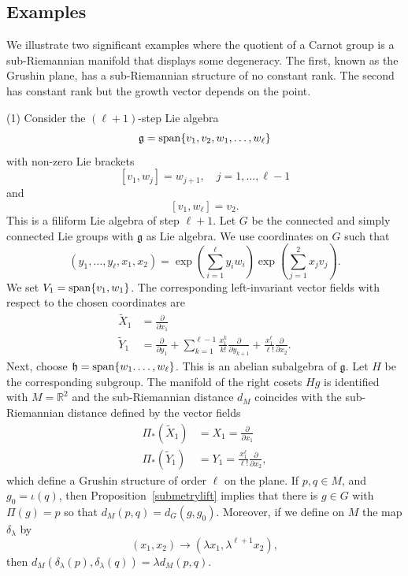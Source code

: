 \documentclass[12pt]{amsart}
\begin{document}
\subsection{Examples}\label{examples}
We illustrate two significant examples where the quotient of a Carnot group is a sub-Riemannian manifold that displays some degeneracy. The first, known as the Grushin plane, has a sub-Riemannian structure of no constant rank. The second has constant rank but the growth vector depends on the point.

(1) Consider the $(\ell +1)$-step Lie algebra 
$$
\mathfrak g = {\rm span}\{v_1,v_2,w_1,\dots,w_\ell\}
$$
with non-zero Lie brackets
$$
[v_1,w_j] = w_{j+1}, \quad j=1,\dots,\ell-1
$$
and
$$
[v_1,w_\ell] = v_2.
$$
This is a filiform Lie algebra of step $\ell +1$.
Let $G$ be the connected and simply connected Lie groups with $\mathfrak g$ as Lie algebra. 
We use coordinates on $G$ such that 
$$
(y_1,\dots,y_\ell,x_1,x_2) = \exp \left(\sum_{i=1}^\ell y_iw_i\right) \exp \left(\sum_{j=1}^2 x_jv_j\right).
$$
We set $V_1 = {\rm span}\{v_1,w_1\}$. 
The corresponding left-invariant vector fields with respect to the chosen coordinates are
\begin{align*}
\tilde X_1 &= \frac{\partial}{\partial x_1}\\
\tilde Y_1 &=  \frac{\partial}{\partial y_1} + \sum_{k=1}^{\ell-1} \frac{x_1^k}{k!} \frac{\partial}{\partial y_{k+1}} + \frac{x_1^\ell}{\ell!}\frac{\partial}{\partial x_{2}}.
\end{align*}
Next, choose $\mathfrak h = {\rm span}\{w_1.\dots,w_\ell\}$. This is an abelian subalgebra of $\mathfrak g$. Let $H$ be the corresponding subgroup. The manifold of the right cosets $Hg$ is identified with $M=\mathbb R^2$ and the sub-Riemannian distance $d_M$  coincides with the sub-Riemannian distance defined by the vector fields
\begin{align*}
\Pi_*(\tilde X_1)&= X_1 = \frac{\partial}{\partial x_1}\\
\Pi_*(\tilde Y_1) &=  Y_1 =   \frac{x_1^\ell}{\ell!}\frac{\partial}{\partial x_{2}},
\end{align*}
which define a Grushin structure of order $\ell$ on the plane.
If $p,q\in M$, and $g_0 = \iota(q)$, then Proposition~\ref{submetrylift} implies that there is $g\in G$ with $\Pi(g)=p$ so that $d_M(p,q)= d_G(g,g_0)$.
Moreover,
if we define on $M$ the map $ \delta_\lambda$ by
$$
(x_1,x_2) \to (\lambda x_1, \lambda^{\ell +1} x_2),
$$
then $d_M( \delta_\lambda(p), \delta_\lambda(q))=\lambda d_M(p,q)$.
\end{document}
